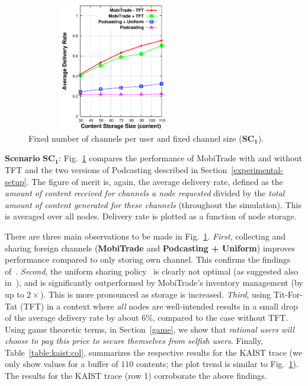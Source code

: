 \begin{figure}[!h]
  \begin{center}
    \includegraphics[width=3in,height=2.2in]{Chapitre5/fig5.eps}
  \end{center}
  \caption{Fixed number of channels per user and fixed channel size ($\mathbf{SC_1}$).}
  \label{CS+FNC+FCS}
\end{figure}

\noindent \textbf{Scenario} $\mathbf{SC_{1}}$: Fig.~\ref{CS+FNC+FCS} compares the performance of MobiTrade with and without TFT and the two versions of Podcasting described in Section~\ref{experimental-setup}. The figure of merit is, again, the average delivery rate, defined as the \emph{amount of content received for channels a node requested} divided by the \emph{total amount of content generated for these channels} (throughout the simulation). This is averaged over all nodes. Delivery rate is plotted as a function of node storage.

There are three main observations to be made in Fig.~\ref{CS+FNC+FCS}. \emph{First}, collecting and sharing foreign channels (\textbf{MobiTrade} and \textbf{Podcasting + Uniform}) improves performance compared to only storing own channel. This confirms the findings of~\cite{Podcasting:Secon07}. \emph{Second}, the uniform sharing policy~\cite{Podcasting:Secon07} is clearly not optimal (as suggested also in~\cite{OptimalChannelChoice}), and is significantly outperformed by MobiTrade's inventory management (by up to $2 \times$). This is more pronounced as storage is increased. \emph{Third}, using Tit-For-Tat (TFT) in a context where \emph{all} nodes are well-intended results in a small drop of the average delivery rate by about $6\%$, compared to the case without TFT. Using game theoretic terms, in Section~\ref{game}, we show that \emph{rational users will choose to pay this price to secure themselves from selfish users}. Finally,  Table~\ref{table:kaist:col}, summarizes the respective results for the KAIST trace (we only show values for a buffer of $110$ contents; the plot trend is similar to Fig.~\ref{CS+FNC+FCS}). The results for the KAIST trace (row 1) corroborate the above findings.


